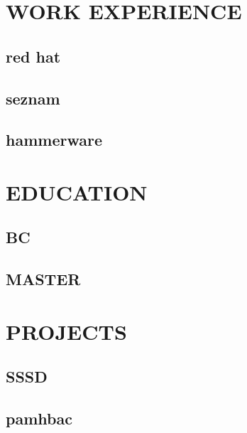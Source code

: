 \documentclass{mycv}
\begin{document}
\begin{paracol}{3}
\lipsum[2]

\section{WORK EXPERIENCE}
\subsection{red hat}
\subsection{seznam}
\subsection{hammerware}

\section{EDUCATION}
\subsection{BC}
\subsection{MASTER}

\end{paracol}

\newpage

\section{PROJECTS}

\subsection{SSSD}

\subsection{pamhbac}

\faGithub
\faTwitter
\faMale
\end{document}

